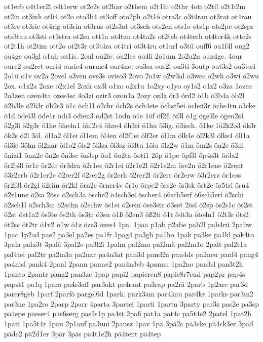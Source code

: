 {ot1erb
o4t1er2l
o4t1erw
ot2e2s
ot2har
o2them
o2t1hi
o2thr
4oti
o2til
o2t1i2m
ot2in
ot3inh
otli4
ot2o
oto3b4
ot3off
oto2ph
o2t1ö
otra3c
o3t4ran
ot3rat
ot4rau
ot3re
ot3ric
ot4rig
ot3rin
ot3rus
ot2s3at
ot3sch
ots2en
ots1o
ots1p
ots2pe
ot2spr
ots3tau
ot3sti
ot3stra
ot2su
ott1a
ot4tan
ot4ta2s
ot2teb
ot4terh
ot4ter4k
otte2s
ot2t1h
ot2tim
ott2o
ot2t3r
ot3t4ra
ot4tri
ot3t4ru
ot1url
o3tü
ouff6
ou1f4l
oug2
ou4ge
ou3gl
o1uh
ou1is.
2oul
ou2le.
ou2les
ou4li
2o1um
2o2u2n
oun4ge.
4our
oure2
ou2ret
ouri4
ourie4
ourme4
our4ne.
ou3sa
ous2i
ou3ti
3outp
out3s2
ou3tu4
2o1ü
o1v
ov2a
2ovel
o3ven
ove3s
oviso3
2ovo
2o1w
o2w3al
o3wec
o2wh
o3wi
o2wu
2ox.
o1x2a
2oxe
o2x1el
2oxk
ox3l
o1xo
o2x1u
1o2xy
o1yo
oy1s2
o1z2
o3za
1ozea
2o3zen
ozen4ta
ozes4sc
4o3zi
ozir3
ozon1a
2ozy
oz3z
ór3
órd2
ö1b
ö3b4a
öb2l
ö2b3le
ö2b3r
öb2s3
ö1c
öch1l
ö2chr
öch2s
öch4ste
öchst5ei
öchst3r
öchs4tu
ö3cke
ö1d
ödel3l
öde1r
ödi3
ödien3
öd2st
1ödu
ö1e
1öf
öf2fl
öf3l
ö1g
öge3le
ögen2s1
ö2g3l
ö2g3r
ö1he
öhe4n1
öhl2e4
öhre4
öh3ri
ö1hu
ö3ig.
ö3isch.
ö1ke
1ö2k2o3
ök3r
ök2s
ö2l
3öl.
öl1a2
öl1ei
öl1em
öl4en
öl2f1ei
ölf2er
öl1in
ölk4e
öl2k3l
ölks4
öll1a
öl3le
3ölm
öl2nar
öl1o2
öls2
öl3sa
öl3sz
öl3tu
1ölu
ölz2w
ö1m
öm2s
ön2e
ö3ni
önizi1
önn2e
ön2s
ön3sc
ön3sp
öo1
öo2ta
öoti1
2öp
ö1pe
öpf3l
öp4s3t
ör3a2
ör2b3l
ör1c
ör2dr
ör3dra
ö2r1ec
ö2r1ei
ö2r1e2l
ö2r1e2m
öre2n
ö2r1ene
ö2rent
ö3r2erb
ö2r1er2e
ö2rer2f
ö2rer2g
ör2erh
ö2rer2l
ör2err
ör2erw
ö3r2erz
ör1ess
ör2f3l
ör2gl
ö2rim
ör2kl
örn2e
örner4v
ör1o
örpe2
örs2e
ör3sk
ört2e
ör5tri
öru4
ö2r1une
ö2sa
2ösc
ö2sch3a
ösche2
ö4sch3ei
öscher4
ö6sch5erf
ö6sch5eri
ö2schi
ö2sch1l
ö2sch3m
ö2schn
ö2schw
ös1ei
ö2sein
öse3str
ö3set
2ösl
ö2sp
ös2s1c
ös2st
ö2st
öst1a2
ös3te
ös2th
ös3tr
ö3su
ö1ß
ößen3
öß2ti
ö1t
ö4t3a
öte4n1
ö2t3r
öts2
öt2sc
öt2tr
ö1v2
ö1w
ö1z
öze3
özes4
1pa.
1paa
p1ab
p2abe
pab2l
pab4rü
2pabw
1pac
1p2ad
pae2
pa3el
pa2es
pa1fr
1pag4
pa3gh
pa1ho
1pak
pa3ke
pa1kl
pak4to
3pala
pala3t
3palä
3pal2e
pa3l2i
1palm
pal2ma
pal2mä
pal2m1o
2palt
pal2t1a
pal4tei
pal2tr
pa2m3a
pa2nar
pa4n3at
pan3d
pand2a
pan4ds
pa2neu
panf4
pang4
pa4nisl
pank4
2panl
2pann
panne2
pan4n3eb
4pannu
1pa2no
pan3sl
pan3t2h
1panto
2pantr
panz2
pan3ze
1pap
papi2
papieren8
papie8r7end
pap2pr
pap4s
papst1
pa1q
1para
pa4r3aff
par3akt
pa4rant
pa3rap
pa2rä
2parb
1p2arc
par3d
parer8geb
1parf
2parfö
pargel6d
1park.
park3am
par4kau
par4kr
1parks
par3m2
par3ne
1pa2ro
2parp
2parr
4parta
3partei
1parti
1partn
3party
par3z
pas2e
pa3sp
pa4spe
passer4
pas6serg
pas2s1p
pa4st
2paß
pat1a
pat4c
pa5t4e2
2patel
1pat2h
1pati
1pa5t4r
1pau
2p1auf
pa3uni
2pausz
1pav
1pä
3pä2c
pä3cke
pä4ck3er
3päd
päde2
pä2d1er
3pär
3päs
pä4t1e2h
pä4tent
pä4tep
}
